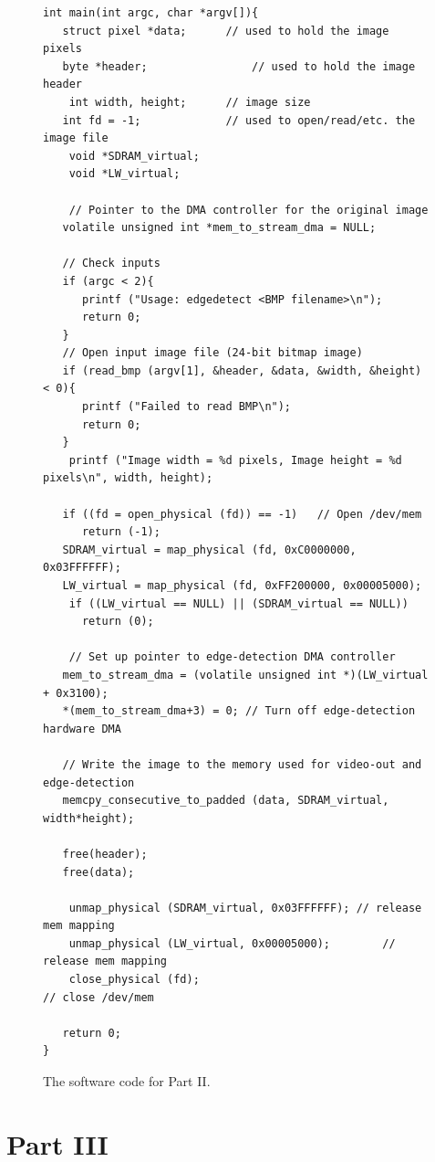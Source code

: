 \documentclass[epsfig,10pt,fullpage]{article}
\begin{document}
\lstset{language=C,numbers=none,escapechar=|,basicstyle=\small\ttfamily,}
\begin{figure}[h]
\begin{center}
\begin{minipage}[t]{15.5 cm}
\begin{lstlisting}[name=part2]
int main(int argc, char *argv[]){
   struct pixel *data;		// used to hold the image pixels
   byte *header;				// used to hold the image header
	int width, height;		// image size
   int fd = -1;				// used to open/read/etc. the image file
	void *SDRAM_virtual;
	void *LW_virtual;

	// Pointer to the DMA controller for the original image
   volatile unsigned int *mem_to_stream_dma = NULL;

   // Check inputs
   if (argc < 2){
      printf ("Usage: edgedetect <BMP filename>\n");
      return 0;
   }
   // Open input image file (24-bit bitmap image)
   if (read_bmp (argv[1], &header, &data, &width, &height) < 0){
      printf ("Failed to read BMP\n");
      return 0;
   }
	printf ("Image width = %d pixels, Image height = %d pixels\n", width, height);
   
   if ((fd = open_physical (fd)) == -1)   // Open /dev/mem
      return (-1);
   SDRAM_virtual = map_physical (fd, 0xC0000000, 0x03FFFFFF);
   LW_virtual = map_physical (fd, 0xFF200000, 0x00005000);
	if ((LW_virtual == NULL) || (SDRAM_virtual == NULL))
      return (0);

	// Set up pointer to edge-detection DMA controller
   mem_to_stream_dma = (volatile unsigned int *)(LW_virtual + 0x3100);
   *(mem_to_stream_dma+3) = 0; // Turn off edge-detection hardware DMA

   // Write the image to the memory used for video-out and edge-detection
   memcpy_consecutive_to_padded (data, SDRAM_virtual, width*height);

   free(header);
   free(data);
   
	unmap_physical (SDRAM_virtual, 0x03FFFFFF);	// release mem mapping
	unmap_physical (LW_virtual, 0x00005000);		// release mem mapping
	close_physical (fd);									// close /dev/mem
   
   return 0;
}
\end{lstlisting}
\end{minipage}
\caption{The software code for Part II.}
\label{fig:part2}
\end{center}
\end{figure}

\section*{Part III}
\end{document}
